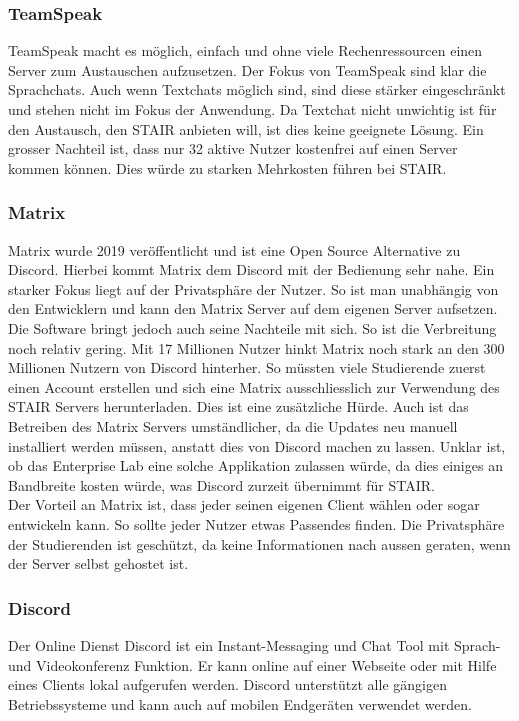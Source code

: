 \documentclass[a4paper, table]{article}
\begin{document}
\subsubsection*{TeamSpeak}
TeamSpeak macht es möglich, einfach und ohne viele Rechenressourcen einen Server zum Austauschen aufzusetzen. 
Der Fokus von TeamSpeak sind klar die Sprachchats. 
Auch wenn Textchats möglich sind, sind diese stärker eingeschränkt und stehen nicht im Fokus der Anwendung. 
Da Textchat nicht unwichtig ist für den Austausch, den STAIR anbieten will, ist dies keine geeignete Lösung. 
Ein grosser Nachteil ist, dass nur 32 aktive Nutzer kostenfrei auf einen Server kommen können. 
Dies würde zu starken Mehrkosten führen bei STAIR.\autocite{mockel_discord_2022}

\subsubsection*{Matrix}
Matrix wurde 2019 veröffentlicht und ist eine Open Source Alternative zu Discord. 
Hierbei kommt Matrix dem Discord mit der Bedienung sehr nahe. 
Ein starker Fokus liegt auf der Privatsphäre der Nutzer. 
So ist man unabhängig von den Entwicklern und kann den Matrix Server auf dem eigenen Server aufsetzen. 
Die Software bringt jedoch auch seine Nachteile mit sich. 
So ist die Verbreitung noch relativ gering. 
Mit 17 Millionen Nutzer\autocite{noauthor_matrixorg_nodate} hinkt Matrix noch stark an den 300 Millionen Nutzern von Discord hinterher.\autocite{david_curry_discord_2022}
So müssten viele Studierende zuerst einen Account erstellen und sich eine Matrix ausschliesslich zur Verwendung des STAIR Servers herunterladen. 
Dies ist eine zusätzliche Hürde. 
Auch ist das Betreiben des Matrix Servers umständlicher, da die Updates neu manuell installiert werden müssen, anstatt dies von Discord machen zu lassen. 
Unklar ist, ob das Enterprise Lab eine solche Applikation zulassen würde, da dies einiges an Bandbreite kosten würde, was Discord zurzeit übernimmt für STAIR.\\
Der Vorteil an Matrix ist, dass jeder seinen eigenen Client wählen oder sogar entwickeln kann.\autocite{noauthor_matrix_nodate}
So sollte jeder Nutzer etwas Passendes finden. 
Die Privatsphäre der Studierenden ist geschützt, da keine Informationen nach aussen geraten, wenn der Server selbst gehostet ist.

\subsubsection{Discord}
Der Online Dienst Discord ist ein Instant-Messaging und Chat Tool mit Sprach- und Videokonferenz Funktion. 
Er kann online auf einer Webseite oder mit Hilfe eines Clients lokal aufgerufen werden. 
Discord unterstützt alle gängigen Betriebssysteme und kann auch auf mobilen Endgeräten verwendet werden.
\end{document}
